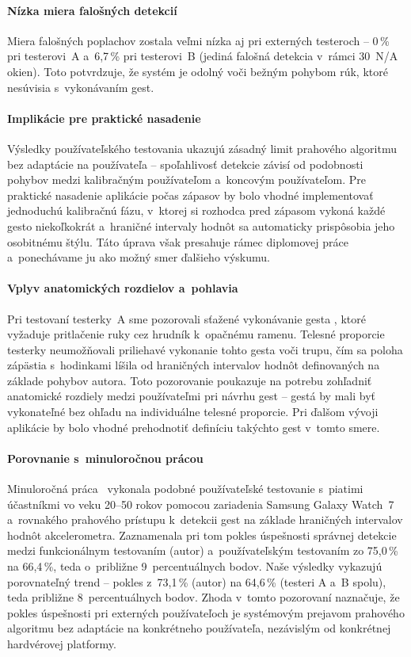 \paragraph{Nízka miera falošných detekcií}
Miera falošných poplachov zostala veľmi nízka aj pri
externých testeroch -- 0\,\% pri testerovi~A
a~6,7\,\% pri testerovi~B (jediná falošná detekcia
v~rámci 30~N/A okien). Toto potvrdzuje, že systém je
odolný voči bežným pohybom rúk, ktoré nesúvisia s~vykonávaním
gest.

\paragraph{Implikácie pre praktické nasadenie}
Výsledky používateľského testovania ukazujú zásadný
limit prahového algoritmu bez adaptácie na používateľa --
spoľahlivosť detekcie závisí od podobnosti pohybov
medzi kalibračným používateľom a~koncovým používateľom.
Pre praktické nasadenie aplikácie počas zápasov by bolo
vhodné implementovať jednoduchú kalibračnú fázu, v~ktorej
si rozhodca pred zápasom vykoná každé gesto niekoľkokrát
a~hraničné intervaly hodnôt sa automaticky prispôsobia jeho
osobitnému štýlu. Táto úprava však presahuje rámec
diplomovej práce a~ponechávame ju ako možný smer
ďalšieho výskumu.

\paragraph{Vplyv anatomických rozdielov a~pohlavia}
Pri testovaní testerky~A sme pozorovali sťažené vykonávanie
gesta , ktoré vyžaduje pritlačenie ruky cez hrudník
k~opačnému ramenu. Telesné proporcie testerky neumožňovali
priliehavé vykonanie tohto gesta voči trupu, čím sa poloha
zápästia s~hodinkami líšila od hraničných intervalov hodnôt
definovaných na základe pohybov autora. Toto pozorovanie
poukazuje na potrebu zohľadniť anatomické rozdiely medzi
používateľmi pri návrhu gest -- gestá by mali byť vykonateľné
bez ohľadu na individuálne telesné proporcie. Pri ďalšom
vývoji aplikácie by bolo vhodné prehodnotiť definíciu
takýchto gest v~tomto smere.

\paragraph{Porovnanie s~minuloročnou prácou}
\label{subsec:porovnanie}
Minuloročná práca~\cite{dp-balla} vykonala podobné používateľské
testovanie s~piatimi účastníkmi vo veku 20--50 rokov pomocou
zariadenia Samsung Galaxy Watch~7 a~rovnakého prahového prístupu
k~detekcii gest na základe hraničných intervalov hodnôt akcelerometra.
Zaznamenala pri tom pokles úspešnosti správnej detekcie medzi
funkcionálnym testovaním (autor) a~používateľským testovaním
zo 75,0\,\% na 66,4\,\%, teda o~približne 9~percentuálnych bodov.
Naše výsledky vykazujú porovnateľný trend -- pokles z~73,1\,\%
(autor) na 64,6\,\% (testeri A a~B spolu), teda približne
8~percentuálnych bodov. Zhoda v~tomto pozorovaní naznačuje, že
pokles úspešnosti pri externých používateľoch je systémovým
prejavom prahového algoritmu bez adaptácie na konkrétneho
používateľa, nezávislým od konkrétnej hardvérovej platformy.

